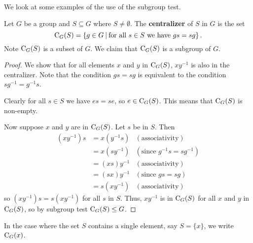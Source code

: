 We look at some examples of the use of the subgroup test.
\begin{example}\label{example-centralizer-of-a-subset}
    Let $G$ be a group and $S \subseteq G$ where $S \neq \emptyset$. The \textbf{centralizer} of $S$ in $G$ is the set
    \[
        \C{G}{S} = \left\{g \in G \vert \text{for all } s \in S \text{ we have } gs = sg\right\}.
    \]
    Note $\mathrm{C}_{G}(S)$ is a subset of $G$. We claim that $\mathrm{C}_{G}(S)$ is a subgroup of $G$.
    \begin{proof}
        We show that for all elements $x$ and $y$ in $\mathrm{C}_{G}(S)$, $xy^{-1}$ is also in the centralizer. Note that the condition $gs = sg$ is equivalent to the condition $sg^{-1} = g^{-1}s$.

        Clearly for all $s \in S$ we have $es = se$, so $e \in \mathrm{C}_{G}(S)$. This means that $\mathrm{C}_{G}(S)$ is non-empty.
        
        Now suppose $x$ and $y$ are in $\mathrm{C}_{G}(S)$. Let $s$ be in $S$. Then
        \begin{align*}
            (xy^{-1})s &= x(y^{-1}s) & (\text{associativity})\\
            &= x(sy^{-1}) & (\text{since } g^{-1}s = sg^{-1})\\
            &= (xs)y^{-1} & (\text{associativity})\\
            &= (sx)y^{-1} & (\text{since } gs = sg)\\
            &= s(xy^{-1}) & (\text{associativity})
        \end{align*}
        so $(xy^{-1})s = s(xy^{-1})$ for all $s$ in $S$. Thus, $xy^{-1}$ is in $\mathrm{C}_{G}(S)$ for all $x$ and $y$ in $\mathrm{C}_{G}(S)$, so by subgroup test $\mathrm{C}_{G}(S) \leq G$.
    \end{proof}
\end{example}
\begin{remark}
    In the case where the set $S$ contains a single element, say $S = \{x\}$, we write $\mathrm{C}_{G}(x)$.
\end{remark}

